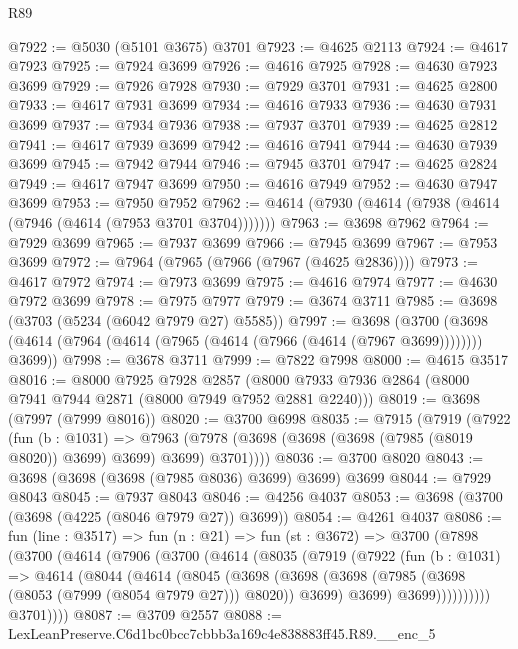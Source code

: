 \begin{lexlean}{R89}
\begin{coremodule}
@7922 := @5030 (@5101 @3675) @3701
@7923 := @4625 @2113
@7924 := @4617 @7923
@7925 := @7924 @3699
@7926 := @4616 @7925
@7928 := @4630 @7923 @3699
@7929 := @7926 @7928
@7930 := @7929 @3701
@7931 := @4625 @2800
@7933 := @4617 @7931 @3699
@7934 := @4616 @7933
@7936 := @4630 @7931 @3699
@7937 := @7934 @7936
@7938 := @7937 @3701
@7939 := @4625 @2812
@7941 := @4617 @7939 @3699
@7942 := @4616 @7941
@7944 := @4630 @7939 @3699
@7945 := @7942 @7944
@7946 := @7945 @3701
@7947 := @4625 @2824
@7949 := @4617 @7947 @3699
@7950 := @4616 @7949
@7952 := @4630 @7947 @3699
@7953 := @7950 @7952
@7962 := @4614 (@7930 (@4614 (@7938 (@4614 (@7946 (@4614 (@7953 @3701 @3704)))))))
@7963 := @3698 @7962
@7964 := @7929 @3699
@7965 := @7937 @3699
@7966 := @7945 @3699
@7967 := @7953 @3699
@7972 := @7964 (@7965 (@7966 (@7967 (@4625 @2836))))
@7973 := @4617 @7972
@7974 := @7973 @3699
@7975 := @4616 @7974
@7977 := @4630 @7972 @3699
@7978 := @7975 @7977
@7979 := @3674 @3711
@7985 := @3698 (@3703 (@5234 (@6042 @7979 @27) @5585))
@7997 := @3698
    (@3700 (@3698 (@4614 (@7964 (@4614 (@7965 (@4614 (@7966 (@4614 (@7967 @3699)))))))) @3699))
@7998 := @3678 @3711
@7999 := @7822 @7998
@8000 := @4615 @3517
@8016 := @8000
    @7925
    @7928
    @2857
    (@8000 @7933 @7936 @2864 (@8000 @7941 @7944 @2871 (@8000 @7949 @7952 @2881 @2240)))
@8019 := @3698 (@7997 (@7999 @8016))
@8020 := @3700 @6998
@8035 := @7915
    (@7919
      (@7922
        (fun (b : @1031) =>
        @7963 (@7978 (@3698 (@3698 (@3698 (@7985 (@8019 @8020)) @3699) @3699) @3699) @3701))))
@8036 := @3700 @8020
@8043 := @3698 (@3698 (@3698 (@7985 @8036) @3699) @3699) @3699
@8044 := @7929 @8043
@8045 := @7937 @8043
@8046 := @4256 @4037
@8053 := @3698 (@3700 (@3698 (@4225 (@8046 @7979 @27)) @3699))
@8054 := @4261 @4037
@8086 := fun (line : @3517) =>
  fun (n : @21) =>
  fun (st : @3672) =>
  @3700
    (@7898
      (@3700
        (@4614
          (@7906
            (@3700
              (@4614
                (@8035
                  (@7919
                    (@7922
                      (fun (b : @1031) =>
                      @4614
                        (@8044
                          (@4614
                            (@8045
                              (@3698
                                (@3698
                                  (@3698
                                    (@7985 (@3698 (@8053 (@7999 (@8054 @7979 @27))) @8020))
                                    @3699)
                                  @3699)
                                @3699))))))))))
            @3701))))
@8087 := @3709 @2557
@8088 := LexLeanPreserve.C6d1bc0bcc7cbbb3a169c4e838883ff45.R89.__enc_5

\end{coremodule}
\end{lexlean}
